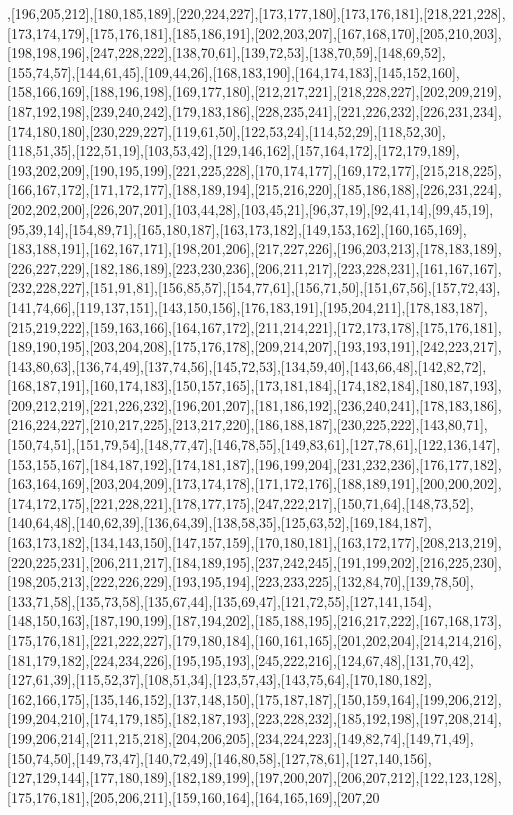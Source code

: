 ,[196,205,212],[180,185,189],[220,224,227],[173,177,180],[173,176,181],[218,221,228],[173,174,179],[175,176,181],[185,186,191],[202,203,207],[167,168,170],[205,210,203],[198,198,196],[247,228,222],[138,70,61],[139,72,53],[138,70,59],[148,69,52],[155,74,57],[144,61,45],[109,44,26],[168,183,190],[164,174,183],[145,152,160],[158,166,169],[188,196,198],[169,177,180],[212,217,221],[218,228,227],[202,209,219],[187,192,198],[239,240,242],[179,183,186],[228,235,241],[221,226,232],[226,231,234],[174,180,180],[230,229,227],[119,61,50],[122,53,24],[114,52,29],[118,52,30],[118,51,35],[122,51,19],[103,53,42],[129,146,162],[157,164,172],[172,179,189],[193,202,209],[190,195,199],[221,225,228],[170,174,177],[169,172,177],[215,218,225],[166,167,172],[171,172,177],[188,189,194],[215,216,220],[185,186,188],[226,231,224],[202,202,200],[226,207,201],[103,44,28],[103,45,21],[96,37,19],[92,41,14],[99,45,19],[95,39,14],[154,89,71],[165,180,187],[163,173,182],[149,153,162],[160,165,169],[183,188,191],[162,167,171],[198,201,206],[217,227,226],[196,203,213],[178,183,189],[226,227,229],[182,186,189],[223,230,236],[206,211,217],[223,228,231],[161,167,167],[232,228,227],[151,91,81],[156,85,57],[154,77,61],[156,71,50],[151,67,56],[157,72,43],[141,74,66],[119,137,151],[143,150,156],[176,183,191],[195,204,211],[178,183,187],[215,219,222],[159,163,166],[164,167,172],[211,214,221],[172,173,178],[175,176,181],[189,190,195],[203,204,208],[175,176,178],[209,214,207],[193,193,191],[242,223,217],[143,80,63],[136,74,49],[137,74,56],[145,72,53],[134,59,40],[143,66,48],[142,82,72],[168,187,191],[160,174,183],[150,157,165],[173,181,184],[174,182,184],[180,187,193],[209,212,219],[221,226,232],[196,201,207],[181,186,192],[236,240,241],[178,183,186],[216,224,227],[210,217,225],[213,217,220],[186,188,187],[230,225,222],[143,80,71],[150,74,51],[151,79,54],[148,77,47],[146,78,55],[149,83,61],[127,78,61],[122,136,147],[153,155,167],[184,187,192],[174,181,187],[196,199,204],[231,232,236],[176,177,182],[163,164,169],[203,204,209],[173,174,178],[171,172,176],[188,189,191],[200,200,202],[174,172,175],[221,228,221],[178,177,175],[247,222,217],[150,71,64],[148,73,52],[140,64,48],[140,62,39],[136,64,39],[138,58,35],[125,63,52],[169,184,187],[163,173,182],[134,143,150],[147,157,159],[170,180,181],[163,172,177],[208,213,219],[220,225,231],[206,211,217],[184,189,195],[237,242,245],[191,199,202],[216,225,230],[198,205,213],[222,226,229],[193,195,194],[223,233,225],[132,84,70],[139,78,50],[133,71,58],[135,73,58],[135,67,44],[135,69,47],[121,72,55],[127,141,154],[148,150,163],[187,190,199],[187,194,202],[185,188,195],[216,217,222],[167,168,173],[175,176,181],[221,222,227],[179,180,184],[160,161,165],[201,202,204],[214,214,216],[181,179,182],[224,234,226],[195,195,193],[245,222,216],[124,67,48],[131,70,42],[127,61,39],[115,52,37],[108,51,34],[123,57,43],[143,75,64],[170,180,182],[162,166,175],[135,146,152],[137,148,150],[175,187,187],[150,159,164],[199,206,212],[199,204,210],[174,179,185],[182,187,193],[223,228,232],[185,192,198],[197,208,214],[199,206,214],[211,215,218],[204,206,205],[234,224,223],[149,82,74],[149,71,49],[150,74,50],[149,73,47],[140,72,49],[146,80,58],[127,78,61],[127,140,156],[127,129,144],[177,180,189],[182,189,199],[197,200,207],[206,207,212],[122,123,128],[175,176,181],[205,206,211],[159,160,164],[164,165,169],[207,20